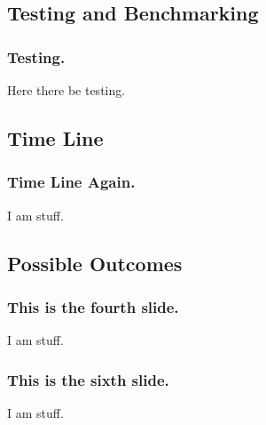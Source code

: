 \documentclass[compress]{beamer}
\begin{document}
\subsection[Testing]{Testing and Benchmarking}
\begin{frame}
\frametitle{Testing.}

Here there be testing.

\end{frame}
\subsection[Time Line]{Time Line}
\begin{frame}
\frametitle{Time Line Again.}

I am stuff.

\end{frame}
\subsection[Possible Outcomes]{Possible Outcomes}
\begin{frame}
\frametitle{This is the fourth slide.}

I am stuff.

\end{frame}
\begin{frame}
\frametitle{This is the sixth slide.}

I am stuff.

\end{frame}
\end{document}

